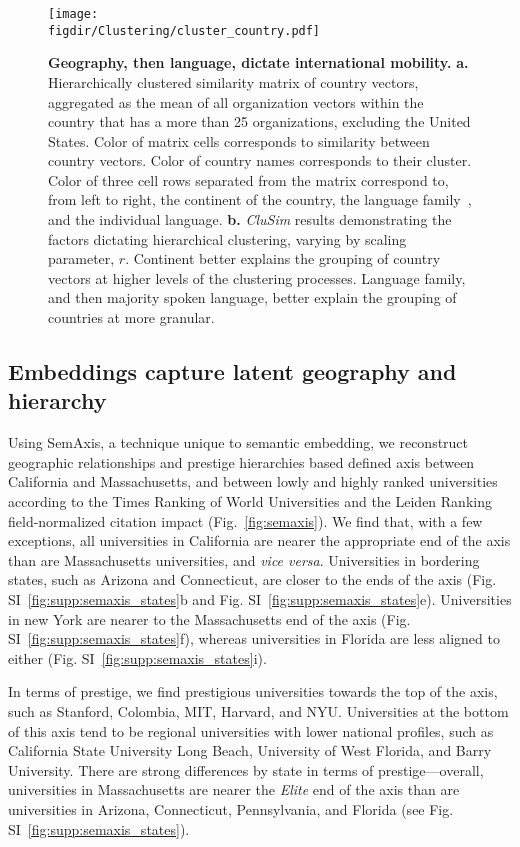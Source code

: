 \documentclass[12pt]{article} %
\def\figdir{../Figs}
\begin{document}
%
%
\begin{figure}[p!]
	\centering
	\texttt{[image: \\figdir/Clustering/cluster\_country.pdf]}
	\caption{
		\textbf{Geography, then language, dictate international mobility.}
		\textbf{a.} Hierarchically clustered similarity matrix of country vectors, aggregated as the mean of all organization vectors within the country that has a more than 25 organizations, excluding the United States. 
		Color of matrix cells corresponds to similarity between country vectors.
		Color of country names corresponds to their cluster.
		Color of three cell rows separated from the matrix correspond to, from left to right, the continent of the country, the language family~\autocite{ethnologue}, and the individual language. 
		\textbf{b.}	\textit{CluSim} \autocite{gates2019element} results demonstrating the factors dictating hierarchical clustering, varying by scaling parameter, $r$. 
		Continent better explains the grouping of country vectors at higher levels of the clustering processes.
		Language family, and then majority spoken language, better explain the grouping of countries at more granular. 
	}
	\label{fig:clustering}
\end{figure}


%
% 
\subsection*{Embeddings capture latent geography and hierarchy}

Using SemAxis, a technique unique to semantic embedding, we reconstruct geographic relationships and prestige hierarchies based defined axis between California and Massachusetts, and between lowly and highly ranked universities according to the Times Ranking of World Universities and the Leiden Ranking field-normalized citation impact (Fig.~\ref{fig:semaxis}). 
We find that, with a few exceptions, all universities in California are nearer the appropriate end of the axis than are Massachusetts universities, and \textit{vice versa}.
Universities in bordering states, such as Arizona and Connecticut, are closer to the ends of the axis (Fig. SI~\ref{fig:supp:semaxis_states}b and Fig. SI~\ref{fig:supp:semaxis_states}e). 
Universities in new York are nearer to the Massachusetts end of the axis (Fig. SI~\ref{fig:supp:semaxis_states}f), whereas universities in Florida are less aligned to either (Fig. SI~\ref{fig:supp:semaxis_states}i). 

In terms of prestige, we find prestigious universities towards the top of the axis, such as Stanford, Colombia, MIT, Harvard, and NYU. 
Universities at the bottom of this axis tend to be regional universities with lower national profiles, such as California State University Long Beach, University of West Florida, and Barry University. 
There are strong differences by state in terms of prestige—overall, universities in Massachusetts are nearer the \textit{Elite} end of the axis than are universities in Arizona, Connecticut, Pennsylvania, and Florida (see Fig. SI~\ref{fig:supp:semaxis_states}). 
\end{document}
